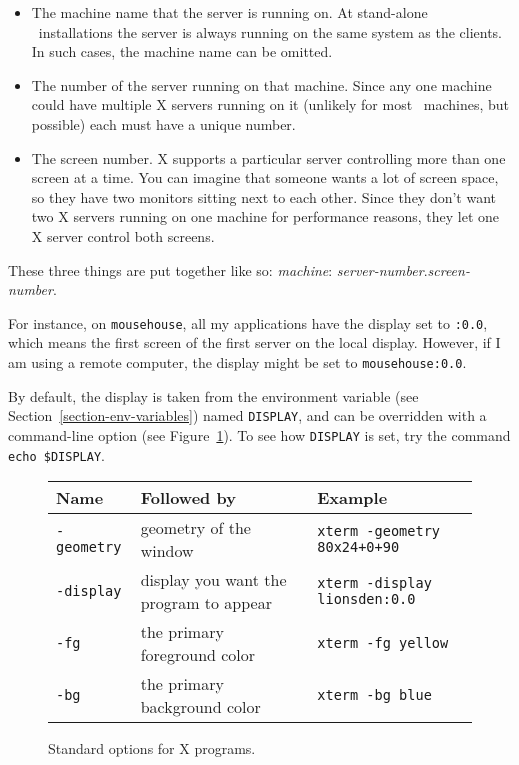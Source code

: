 \begin{itemize}
\item The machine name that the server is running on.  At stand-alone
  \linux\ installations the server is always running on the same
  system as the clients. In such cases, the machine name can be
  omitted.
\item The number of the server running on that machine. Since any one
  machine could have multiple X servers running on it (unlikely for
  most \linux\ machines, but possible) each must have a unique number.
\item The screen number.  X supports a particular server controlling
  more than one screen at a time. You can imagine that someone wants a
  lot of screen space, so they have two monitors sitting next to each
  other. Since they don't want two X servers running on one machine
  for performance reasons, they let one X server control both screens.
\end{itemize}

These three things are put together like so: {\sl machine\/}:{\sl
  server-number\/}.{\sl screen-number\/}.

For instance, on {\tt mousehouse}, all my applications have the
display set to {\tt :0.0}, which means the first screen of the first
server on the local display. However, if I am using a remote computer,
the display might be set to {\tt mousehouse:0.0}.

By default, the display is taken from the environment variable (see
Section~\ref{section-env-variables}) named {\tt DISPLAY}, and can be
overridden with a command-line option (see
Figure~\ref{x-standard-options}). To see how {\tt DISPLAY} is set, try
the command {\tt echo \$DISPLAY}.

\begin{figure}
\begin{center}
\begin{tabular}{|l|p{.4\linewidth}|p{.4\linewidth}|}\hline
  Name & Followed by & Example\\ \hline
{\tt -geometry} & geometry of the window & {\tt xterm
  -geometry 80x24+0+90}\\ \hline
{\tt -display}  & display you want the program to appear &
                  {\tt xterm -display lionsden:0.0}\\ \hline
{\tt -fg} & the primary foreground color & {\tt xterm -fg
  yellow}\\ \hline
{\tt -bg} & the primary background color & {\tt xterm -bg blue}\\ \hline
\end{tabular}
\end{center}
\caption{Standard options for X programs.}\label{x-standard-options}
\end{figure}


